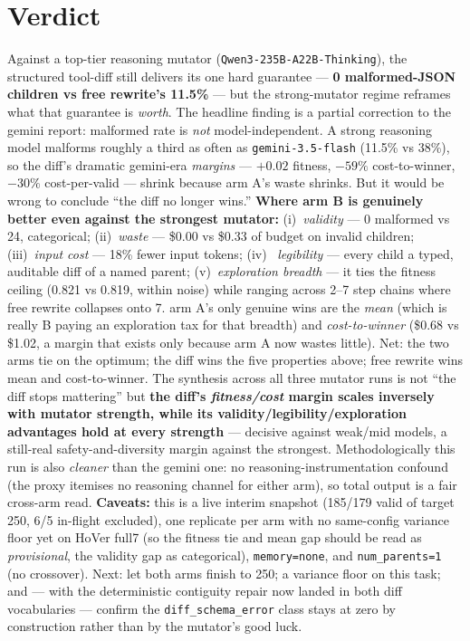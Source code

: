 \documentclass[11pt]{article}
\newcommand{\armA}{\textcolor{bad}{arm A}}
\newcommand{\armB}{\textcolor{accent}{arm B}}
\begin{document}
\section{Verdict}
Against a top-tier reasoning mutator (\texttt{Qwen3-235B-A22B-Thinking}), the structured tool-diff
still delivers its one hard guarantee --- \textbf{0 malformed-JSON children vs free rewrite's 11.5\%}
--- but the strong-mutator regime reframes what that guarantee is \emph{worth}. The headline finding
is a partial correction to the gemini report: malformed rate is \emph{not} model-independent. A
strong reasoning model malforms roughly a third as often as \texttt{gemini-3.5-flash} (11.5\% vs
38\%), so the diff's dramatic gemini-era \emph{margins} --- $+0.02$ fitness, $-59\%$ cost-to-winner,
$-30\%$ cost-per-valid --- shrink because \armA's waste shrinks. But it would be wrong to conclude
``the diff no longer wins.'' \textbf{Where \armB{} is genuinely better even against the strongest
mutator:} (i)~\emph{validity} --- 0 malformed vs 24, categorical; (ii)~\emph{waste} --- \$0.00 vs
\$0.33 of budget on invalid children; (iii)~\emph{input cost} --- 18\% fewer input tokens; (iv)~%
\emph{legibility} --- every child a typed, auditable diff of a named parent; (v)~\emph{exploration
breadth} --- it ties the fitness ceiling (0.821 vs 0.819, within noise) while ranging across 2--7
step chains where free rewrite collapses onto 7. \armA's only genuine wins are the \emph{mean} (which
is really B paying an exploration tax for that breadth) and \emph{cost-to-winner} (\$0.68 vs \$1.02,
a margin that exists only because \armA{} now wastes little). Net: the two arms tie on the optimum;
the diff wins the five properties above; free rewrite wins mean and cost-to-winner. The synthesis
across all three mutator runs is not ``the diff stops mattering'' but \textbf{the diff's \emph{fitness/cost}
margin scales inversely with mutator strength, while its validity/legibility/exploration advantages
hold at every strength} --- decisive against weak/mid models, a still-real safety-and-diversity margin
against the strongest.
Methodologically this run is also \emph{cleaner} than the gemini one: no reasoning-instrumentation
confound (the proxy itemises no reasoning channel for either arm), so total output is a fair
cross-arm read. \textbf{Caveats:} \textcolor{warn}{this is a live interim snapshot} (185/179 valid of
target 250, 6/5 in-flight excluded), one replicate per arm with no same-config variance floor yet on
HoVer full7 (so the fitness tie and mean gap should be read as \emph{provisional}, the validity gap
as categorical), \texttt{memory=none}, and \texttt{num\_parents=1} (no crossover). Next: let both arms
finish to 250; a variance floor on this task; and --- with the deterministic contiguity repair now
landed in both diff vocabularies --- confirm the \texttt{diff\_schema\_error} class stays at zero by
construction rather than by the mutator's good luck.
\end{document}
